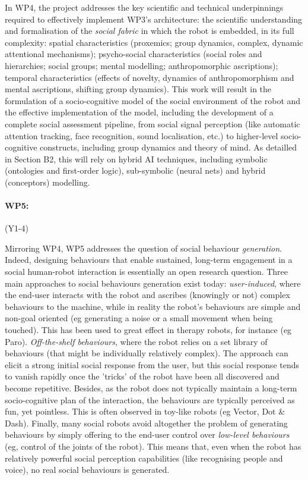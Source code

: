 \documentclass[11pt]{report}
\begin{document}
In WP4, the project addresses the key scientific and technical underpinnings
required to effectively implement WP3's architecture:  the scientific
understanding and formalisation of the \emph{social fabric} in which the robot
is embedded, in its full complexity: spatial characteristics (proxemics; group
dynamics, complex, dynamic attentional mechanisms); psycho-social
characteristics (social roles and hierarchies; social groups; mental modelling;
anthropomorphic ascriptions); temporal characteristics (effects of novelty,
dynamics of anthropomorphism and mental ascriptions, shifting group dynamics).
This work will result in the formulation of a socio-cognitive model of the
social environment of the robot and the effective implementation of the model,
including the development of a complete social assessment pipeline, from social
signal perception (like automatic attention tracking, face recognition, sound
localisation, etc.) to higher-level socio-cognitive constructs, including group
dynamics and theory of mind. As detailled in Section B2, this will rely on
hybrid AI techniques, including symbolic (ontologies and first-order logic),
sub-symbolic (neural nets) and hybrid (conceptors) modelling.

\paragraph{WP5: \textbf{\wpFive}} (Y1-4)

Mirroring WP4, WP5 addresses the question of social behaviour \emph{generation}.
Indeed, designing behaviours that enable sustained, long-term engagement in a
social human-robot interaction is essentially an open research question. Three
main approaches to social behaviours generation exist today:
\emph{user-induced}, where the end-user interacts with the robot and ascribes
(knowingly or not) complex behaviours to the machine, while in reality the
robot's behaviours are simple and non-goal oriented (eg generating a noise or a
small movement when being touched). This has been used to great effect in
therapy robots, for instance (eg Paro). \emph{Off-the-shelf behaviours}, where
the robot relies on a set library of behaviours (that might be individually
relatively complex). The approach can elicit a strong initial social response
from the user, but this social response tends to vanish rapidly once the
'tricks' of the robot have been all discovered and become repetitive.  Besides,
as the robot does not typically maintain a long-term socio-cognitive plan of the
interaction, the behaviours are typically perceived as fun, yet pointless. This
is often observed in toy-like robots (eg Vector, Dot \& Dash). Finally, many
social robots avoid altogether the problem of generating behaviours by simply
offering to the end-user control over \emph{low-level behaviours} (eg, control
of the joints of the robot). This means that, even when the robot has relatively
powerful social perception capabilities (like recognising people and voice), no
real social behaviours is generated.
\end{document}
